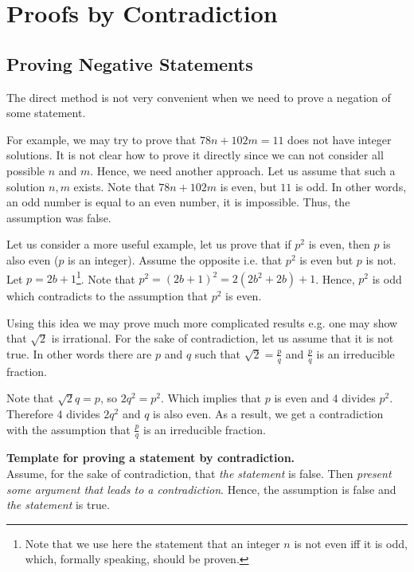 \chapter{Proofs by Contradiction}
\label{chapter:indirect-proofs}
\section{Proving Negative Statements}
The direct method is not very convenient when we need to prove a negation of
some statement.

For example, we may try to prove that $78 n + 102 m = 11$ does not have integer
solutions. It is not clear how to prove it directly since we can not consider
all possible $n$ and $m$. Hence, we need another approach. Let us assume that
such a solution $n, m$ exists. Note that $78 n + 102 m$ is even, but $11$ is
odd. In other words, an odd number is equal to an even number, it is impossible.
Thus, the assumption was false.

Let us consider a more useful example, let us prove that if $p^2$ is even, then
$p$ is also even ($p$ is an integer). Assume the opposite i.e. that $p^2$ is
even but $p$ is not. Let $p = 2b + 1$\footnote{Note that we use here the
statement that an integer $n$ is not even iff it is odd, which, formally
speaking, should be proven.}. Note that $p^2 = (2b + 1)^2 = 2(2b^2 + 2b) + 1$.
Hence, $p^2$ is odd which contradicts to the assumption that $p^2$ is even.

Using this idea we may prove much more complicated results e.g. one may show
that $\sqrt{2}$ is irrational. For the sake of contradiction, let us assume
that it is not true. In other words there are $p$ and $q$ such that
$\sqrt{2} = \frac{p}{q}$ and $\frac{p}{q}$ is an irreducible fraction.

Note that $\sqrt{2} q = p$, so $2q^2 = p^2$. Which implies that $p$ is even
and $4$ divides $p^2$. Therefore $4$ divides $2q^2$ and $q$ is also even. As
a result, we get a contradiction with the assumption that $\frac{p}{q}$ is an
irreducible fraction.

\begin{template}
  \textbf{Template for proving a statement by contradiction.} \\

  Assume, for the sake of contradiction, that \emph{the statement} is false.
  Then \emph{present some argument that leads to a contradiction}. Hence, the
  assumption is false and \emph{the statement} is true.
\end{template}

